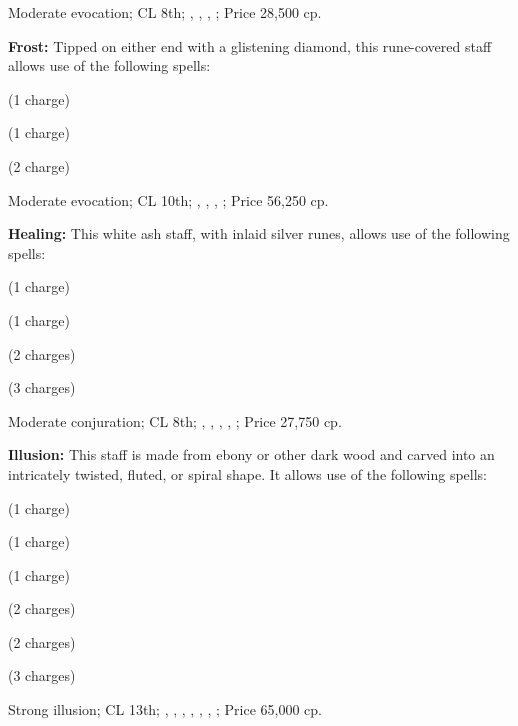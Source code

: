 Moderate evocation; CL 8th; , , , ; Price 28,500 cp.

\textbf{Frost:} Tipped on either end with a glistening diamond, this rune-covered staff allows use of the following spells:
\begin{itemize*}
\item {} (1 charge)
\item {} (1 charge)
\item {} (2 charge)
\end{itemize*}

Moderate evocation; CL 10th; , , , ; Price 56,250 cp.

\textbf{Healing:} This white ash staff, with inlaid silver runes, allows use of the following spells:
\begin{itemize*}
\item {} (1 charge)
\item {} (1 charge)
\item {} (2 charges)
\item {} (3 charges)
\end{itemize*}

Moderate conjuration; CL 8th; , , , , ; Price 27,750 cp.

\textbf{Illusion:} This staff is made from ebony or other dark wood and carved into an intricately twisted, fluted, or spiral shape. It allows use of the following spells:
\begin{itemize*}
\item {} (1 charge)
\item {} (1 charge)
\item {} (1 charge)
\item {} (2 charges)
\item {} (2 charges)
\item {} (3 charges)
\end{itemize*}

Strong illusion; CL 13th; , , , , , , ; Price 65,000 cp.

